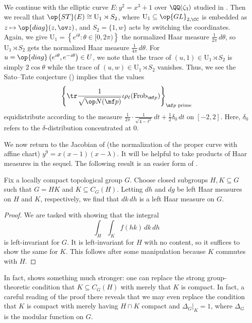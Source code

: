 \documentclass[../thesis.tex]{subfiles}
\begin{document}
\begin{example} \label{ex:pot-cm-ec-st-measure}
	We continue with the elliptic curve $E\colon y^2=x^3+1$ over $\QQ(\zeta_3)$ studied in . Then we recall that $\op{ST}(E)\cong\mathrm U_1\rtimes S_2$, where $\mathrm U_1\subseteq\op{GL}_{2,\CC}$ is embedded as $z\mapsto\op{diag}(z,\ov z)$, and $S_2=\{1,w\}$ acts by switching the coordinates. Again, we give $\mathrm U_1=\left\{e^{i\theta}:\theta\in[0,2\pi)\right\}$ the normalized Haar measure $\frac1{2\pi}\,d\theta$, so $\mathrm U_1\rtimes S_2$ gets the normalized Haar measure $\frac1{4\pi}\,d\theta$. For $u=\op{diag}\left(e^{i\theta},e^{-i\theta}\right)\in U$, we note that the trace of $(u,1)\in\mathrm U_1\rtimes S_2$ is simply $2\cos\theta$ while the trace of $(u,w)\in\mathrm U_1\rtimes S_2$ vanishes. Thus, we see the Sato--Tate conjecture () implies that the values
	\[\left\{\tr\frac1{\sqrt{\op N(\mf p)}}\iota\rho_\ell(\mathrm{Frob}_{\mf p})\right\}_{\mf p\text{ prime}}\]
	equidistribute according to the measure $\frac1{2\pi}\cdot\frac1{\sqrt{4-t^2}}\,dt+\frac12\delta_0\,dt$ on $[-2,2]$. Here, $\delta_0$ refers to the $\delta$-distribution concentrated at $0$.
\end{example}
We now return to the Jacobian of (the normalization of the proper curve with affine chart) $y^9=x(x-1)(x-\lambda)$. It will be helpful to take products of Haar measures in the sequel. The following result is an easier form of \cite[Proposition~1.5.6]{de-harmonic-analysis}.
\begin{lemma} \label{lem:product-haar-measure}
	Fix a locally compact topological group $G$. Choose closed subgroups $H,K\subseteq G$ such that $G=HK$ and $K\subseteq C_G(H)$. Letting $dh$ and $dg$ be left Haar measures on $H$ and $K$, respectively, we find that $dk\,dh$ is a left Haar measure on $G$.
\end{lemma}
\begin{proof}
	We are tasked with showing that the integral
	\[\int_H\int_Kf(hk)\,dk\,dh\]
	is left-invariant for $G$. It is left-invariant for $H$ with no content, so it suffices to show the same for $K$. This follows after some manipulation because $K$ commutes with $H$.
\end{proof}
\begin{remark}
	In fact, \cite[Proposition~1.5.6]{de-harmonic-analysis} shows something much stronger: one can replace the strong group-theoretic condition that $K\subseteq C_G(H)$ with merely that $K$ is compact. In fact, a careful reading of the proof there reveals that we may even replace the condition that $K$ is compact with merely having $H\cap K$ compact and $\Delta_G|_K=1$, where $\Delta_G$ is the modular function on $G$.
\end{remark}
\end{document}
